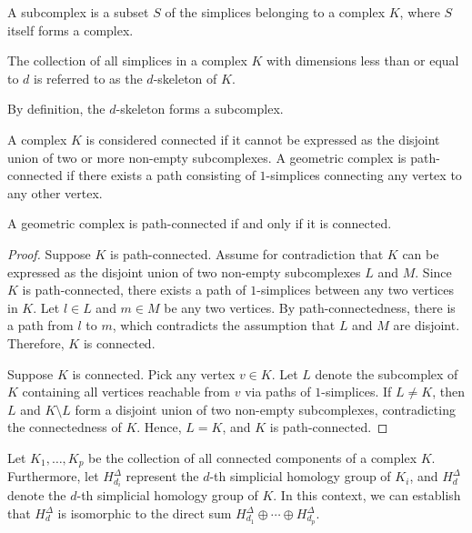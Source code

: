 \begin{definition}
A subcomplex is a subset \( S \) of the simplices belonging to a complex \( K \), where \( S \) itself forms a complex.
\end{definition}

\begin{definition}
The collection of all simplices in a complex \( K \) with dimensions less than or equal to \( d \) is referred to as the \( d \)-skeleton of \( K \).
\end{definition}

By definition, the \( d \)-skeleton forms a subcomplex.

\begin{definition}
A complex \( K \) is considered connected if it cannot be expressed as the disjoint union of two or more non-empty subcomplexes. A geometric complex is path-connected if there exists a path consisting of \( 1 \)-simplices connecting any vertex to any other vertex.
\end{definition}

\begin{lemma}
\label{pathconnect}
A geometric complex is path-connected if and only if it is connected.
\end{lemma}

\begin{proof}
Suppose \( K \) is path-connected. Assume for contradiction that \( K \) can be expressed as the disjoint union of two non-empty subcomplexes \( L \) and \( M \). Since \( K \) is path-connected, there exists a path of \( 1 \)-simplices between any two vertices in \( K \). Let \( l \in L \) and \( m \in M \) be any two vertices. By path-connectedness, there is a path from \( l \) to \( m \), which contradicts the assumption that \( L \) and \( M \) are disjoint. Therefore, \( K \) is connected.

Suppose \( K \) is connected. Pick any vertex \( v \in K \). Let \( L \) denote the subcomplex of \( K \) containing all vertices reachable from \( v \) via paths of \( 1 \)-simplices. If \( L \neq K \), then \( L \) and \( K \setminus L \) form a disjoint union of two non-empty subcomplexes, contradicting the connectedness of \( K \). Hence, \( L = K \), and \( K \) is path-connected.
\end{proof}

\begin{theorem}{\cite[p.105ff]{hatcher2005algebraic}}
Let \( K_{1}, \ldots, K_{p} \) be the collection of all connected components of a complex \( K \). Furthermore, let \( H^{\Delta}_{d_i} \) represent the \( d \)-th simplicial homology group of \( K_{i} \), and \( H^{\Delta}_{d} \) denote the \( d \)-th simplicial homology group of \( K \). In this context, we can establish that \( H^{\Delta}_{d} \) is isomorphic to the direct sum \( H^{\Delta}_{d_1} \oplus \cdots \oplus H^{\Delta}_{d_p} \).
\end{theorem}

